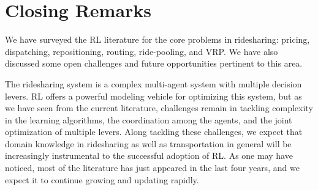 \documentclass{article}
\begin{document}
\section{Closing Remarks}
We have surveyed the RL literature for the core problems in ridesharing: pricing, dispatching, repositioning, routing, ride-pooling, and VRP. We have also discussed some open challenges and future opportunities pertinent to this area. 

The ridesharing system is a complex multi-agent system with multiple decision levers. RL offers a powerful modeling vehicle for optimizing this system, but as we have seen from the current literature, challenges remain in tackling complexity in the learning algorithms, the coordination among the agents, and the joint optimization of multiple levers. Along tackling these challenges, we expect that domain knowledge in ridesharing as well as transportation in general will be increasingly instrumental to the successful adoption of RL. As one may have noticed, most of the literature has just appeared in the last four years, and we expect it to continue growing and updating rapidly. 

% 


\end{document}
